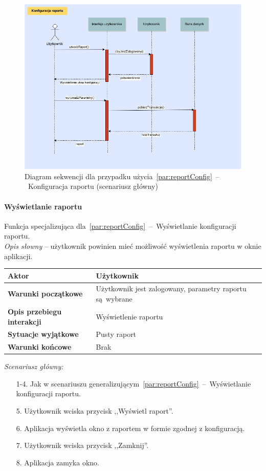 \begin{figure}[H]
  \includegraphics[width=\textwidth]{images/raport_konfig.png}
  \caption{Diagram sekwencji dla przypadku użycia~\ref{par:reportConfig}~--~Konfiguracja raportu (scenariusz główny)}
\end{figure}

\paragraph{Wyświetlanie raportu\newline}
\label{par:reportView}
\indent Funkcja specjalizująca dla~\ref{par:reportConfig}~--~Wyświetlanie konfiguracji raportu.\\

\textit{Opis słowny} -- użytkownik powinien mieć możliwość wyświetlenia raportu w oknie aplikacji.

\begin{longtable}{|p{5cm}|p{7cm}|}
  \hline \textbf{Aktor} & Użytkownik \\
  \hline \textbf{Warunki początkowe} & Użytkownik jest zalogowany, parametry raportu są~wybrane \\
  \hline \textbf{Opis przebiegu interakcji} & Wyświetlenie raportu \\
  \hline \textbf{Sytuacje wyjątkowe} & Pusty raport \\
  \hline \textbf{Warunki końcowe} & Brak \\
  \hline
\end{longtable}

\noindent \textit{Scenariusz główny:}
\begin{enumerate}
  \item[1-4.] Jak w scenariuszu generalizującym~\ref{par:reportConfig}~--~Wyświetlanie konfiguracji raportu.
  \item[5.] Użytkownik wciska przycisk ,,Wyświetl raport''.
  \item[6.] Aplikacja wyświetla okno z raportem w formie zgodnej z konfiguracją.
  \item[7.] Użytkownik wciska przycisk ,,Zamknij''.
  \item[8.] Aplikacja zamyka okno.
\end{enumerate}

